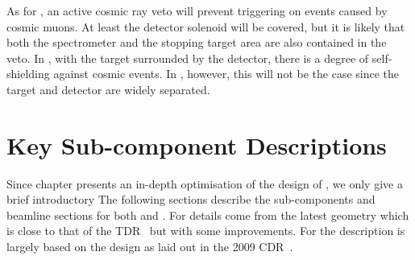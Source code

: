 As for \phaseI, an active cosmic ray veto will prevent triggering on events caused by cosmic muons.
At least the detector solenoid will be covered, but it is likely that both the spectrometer and the stopping target area are also contained in the veto.
In \phaseI, with the target surrounded by the detector, there is a degree of self-shielding against cosmic events. 
In \phaseII, however, this will not be the case since the target and detector are widely separated.

\section{Key Sub-component Descriptions}
Since chapter  presents an in-depth optimisation of the design of \phaseII,
we only give a brief introductory 
The following sections describe the sub-components and beamline sections for both \phaseI and \phaseII.
For \phaseI details come from the latest geometry which is close to that of the TDR~\cite{TDR2016} but with some improvements.
For \phaseII the description is largely based on the design as laid out in the 2009 CDR~\cite{CDRphase2}.


